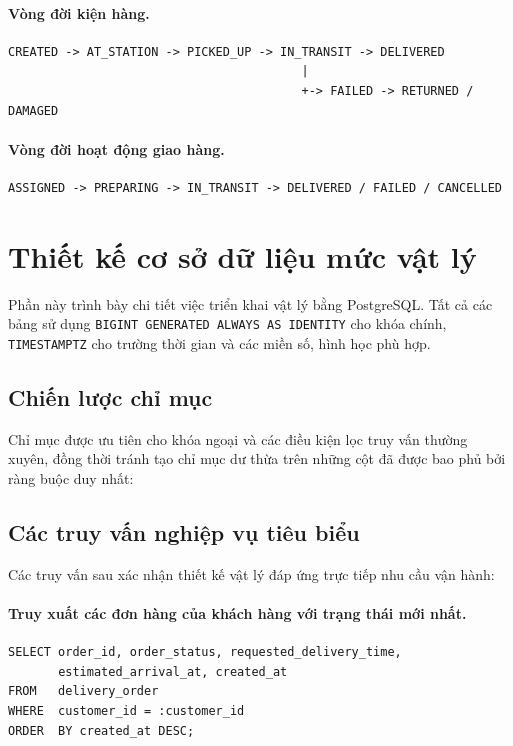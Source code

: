 \paragraph{Vòng đời kiện hàng.}
\begin{verbatim}
CREATED -> AT_STATION -> PICKED_UP -> IN_TRANSIT -> DELIVERED
                                         |
                                         +-> FAILED -> RETURNED / DAMAGED
\end{verbatim}

\paragraph{Vòng đời hoạt động giao hàng.}
\begin{verbatim}
ASSIGNED -> PREPARING -> IN_TRANSIT -> DELIVERED / FAILED / CANCELLED
\end{verbatim}

\section{Thiết kế cơ sở dữ liệu mức vật lý}\label{s:physical}

Phần này trình bày chi tiết việc triển khai vật lý bằng PostgreSQL. Tất cả các bảng sử dụng \texttt{BIGINT GENERATED ALWAYS AS IDENTITY} cho khóa chính, \texttt{TIMESTAMPTZ} cho trường thời gian và các miền số, hình học phù hợp.
\subsection{Chiến lược chỉ mục}\label{s:indexes}
Chỉ mục được ưu tiên cho khóa ngoại và các điều kiện lọc truy vấn thường xuyên, đồng thời tránh tạo chỉ mục dư thừa trên những cột đã được bao phủ bởi ràng buộc duy nhất:

\subsection{Các truy vấn nghiệp vụ tiêu biểu}

Các truy vấn sau xác nhận thiết kế vật lý đáp ứng trực tiếp nhu cầu vận hành:

\paragraph{Truy xuất các đơn hàng của khách hàng với trạng thái mới nhất.}
\begin{verbatim}
SELECT order_id, order_status, requested_delivery_time,
       estimated_arrival_at, created_at
FROM   delivery_order
WHERE  customer_id = :customer_id
ORDER  BY created_at DESC;
\end{verbatim}

